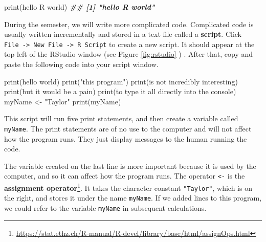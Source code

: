 \documentclass[
  12pt,
]{krantz}
\makeatletter
\newenvironment{Shaded}{\begin{snugshade}}{\end{snugshade}}
\newcommand{\DocumentationTok}[1]{\textcolor[rgb]{0.37,0.37,0.37}{\textbf{\textit{#1}}}}
\newcommand{\FunctionTok}[1]{\textcolor[rgb]{0,0,0}{#1}}
\newcommand{\NormalTok}[1]{#1}
\newcommand{\OtherTok}[1]{\textcolor[rgb]{0.37,0.37,0.37}{#1}}
\newcommand{\StringTok}[1]{\textcolor[rgb]{0.5,0.5,0.5}{#1}}
\renewcommand{\href}[2]{#2\footnote{\url{#1}}}
\newenvironment{kframe}{%
\medskip{}
\setlength{\fboxsep}{.8em}
 \def\at@end@of@kframe{}%
 \ifinner\ifhmode%
  \def\at@end@of@kframe{\end{minipage}}%
  \begin{minipage}{\columnwidth}%
 \fi\fi%
 \def\FrameCommand##1{\hskip\@totalleftmargin \hskip-\fboxsep
 \colorbox{shadecolor}{##1}\hskip-\fboxsep
     \hskip-\linewidth \hskip-\@totalleftmargin \hskip\columnwidth}%
 \MakeFramed {\advance\hsize-\width
   \@totalleftmargin\z@ \linewidth\hsize
   \@setminipage}}%
 {\par\unskip\endMakeFramed%
 \at@end@of@kframe}
\renewenvironment{Shaded}{\begin{kframe}}{\end{kframe}}
\makeatother
\begin{document}
\begin{Shaded}
\begin{Highlighting}[]
\FunctionTok{print}\NormalTok{(}\StringTok{\textquotesingle{}hello R world\textquotesingle{}}\NormalTok{)}
\DocumentationTok{\#\# [1] "hello R world"}
\end{Highlighting}
\end{Shaded}

During the semester, we will write more complicated code. Complicated code is usually written incrementally and stored in a text file called a \textbf{script}. Click \texttt{File\ -\textgreater{}\ New\ File\ -\textgreater{}\ R\ Script} to create a new script. It should appear at the top left of the RStudio window (see Figure \ref{fig:rstudio} ) . After that, copy and paste the following code into your script window.

\begin{Shaded}
\begin{Highlighting}[]
\FunctionTok{print}\NormalTok{(}\StringTok{\textquotesingle{}hello world\textquotesingle{}}\NormalTok{)}
\FunctionTok{print}\NormalTok{(}\StringTok{"this program"}\NormalTok{)}
\FunctionTok{print}\NormalTok{(}\StringTok{\textquotesingle{}is not incredibly interesting\textquotesingle{}}\NormalTok{)}
\FunctionTok{print}\NormalTok{(}\StringTok{\textquotesingle{}but it would be a pain\textquotesingle{}}\NormalTok{)}
\FunctionTok{print}\NormalTok{(}\StringTok{\textquotesingle{}to type it all directly into the console\textquotesingle{}}\NormalTok{)}
\NormalTok{myName }\OtherTok{\textless{}{-}} \StringTok{"Taylor"}
\FunctionTok{print}\NormalTok{(myName)}
\end{Highlighting}
\end{Shaded}

This script will run five print statements, and then create a variable called \texttt{myName}. The print statements are of no use to the computer and will not affect how the program runs. They just display messages to the human running the code.

The variable created on the last line is more important because it is used by the computer, and so it can affect how the program runs. The operator \texttt{\textless{}-} is the \href{https://stat.ethz.ch/R-manual/R-devel/library/base/html/assignOps.html}{\textbf{assignment operator}}. It takes the character constant \texttt{"Taylor"}, which is on the right, and stores it under the name \texttt{myName}. If we added lines to this program, we could refer to the variable \texttt{myName} in subsequent calculations.
\end{document}
